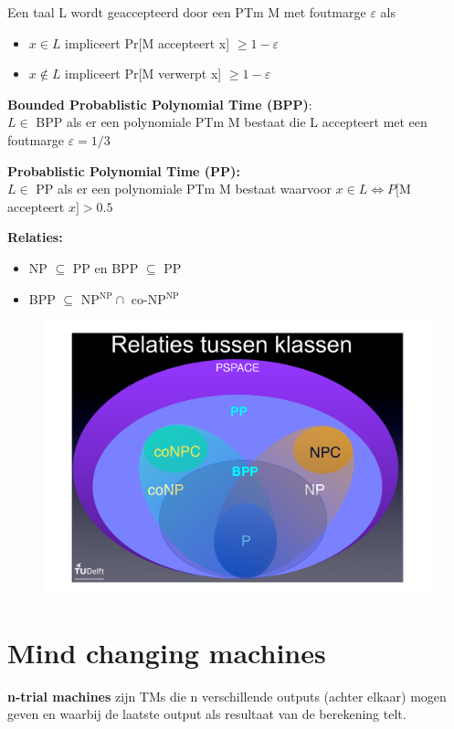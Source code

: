 \documentclass[]{article}
\begin{document}
\medskip

Een taal L wordt geaccepteerd door een PTm M met foutmarge $\varepsilon$ als
\begin{itemize}
\item $x \in L$ impliceert Pr[M accepteert x] $\geq 1 - \varepsilon$
\item $x \not\in L$ impliceert Pr[M verwerpt x] $\geq 1 - \varepsilon$
\end{itemize}

\medskip

\textbf{Bounded Probablistic Polynomial Time (BPP)}: \\
\hspace*{1cm} $L \in$ BPP als er een polynomiale PTm M bestaat die L accepteert met een foutmarge $\varepsilon = 1/3$

\textbf{Probablistic Polynomial Time (PP):} \\
\hspace*{1cm} $L \in$ PP als er een polynomiale PTm M bestaat waarvoor $x \in L \Leftrightarrow P[$M accepteert $x] > 0.5$

\textbf{Relaties:}
\begin{itemize}
\item NP $\subseteq$ PP en BPP $\subseteq$ PP
\item BPP $\subseteq$ NP$^\text{NP} \cap$ co-NP$^\text{NP}$
\end{itemize}

\begin{figure}[H]
\centering
\includegraphics[width=0.6\columnwidth]{slides/bpp}
\end{figure}

\section*{Mind changing machines}

\textbf{n-trial machines} zijn TMs die n verschillende outputs (achter elkaar) mogen geven en waarbij de laatste output als resultaat van de berekening telt.
\end{document}

